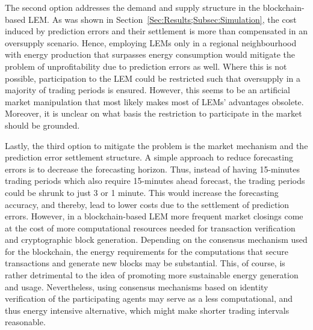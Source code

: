 The second option addresses the demand and supply structure in the blockchain-based LEM. As was shown in Section~\ref{Sec:Results;Subsec:Simulation}, the cost induced by prediction errors and their settlement is more than compensated in an oversupply scenario. Hence, employing LEMs only in a regional neighbourhood with energy production that surpasses energy consumption would mitigate the problem of unprofitability due to prediction errors as well. Where this is not possible, participation to the LEM could be restricted such that oversupply in a majority of trading periods is ensured. However, this seems to be an artificial market manipulation that most likely makes most of LEMs' advantages obsolete. Moreover, it is unclear on what basis the restriction to participate in the market should be grounded.

Lastly, the third option to mitigate the problem is the market mechanism and the prediction error settlement structure. A simple approach to reduce forecasting errors is to decrease the forecasting horizon. Thus, instead of having 15-minutes trading periods which also require 15-minutes ahead forecast, the trading periods could be shrunk to just 3 or 1 minute. This would increase the forecasting accuracy, and thereby, lead to lower costs due to the settlement of prediction errors. However, in a blockchain-based LEM more frequent market closings come at the cost of more computational resources needed for transaction verification and cryptographic block generation. Depending on the consensus mechanism used for the blockchain, the energy requirements for the computations that secure transactions and generate new blocks may be substantial. This, of course, is rather detrimental to the idea of promoting more sustainable energy generation and usage. Nevertheless, using consensus mechanisms based on identity verification of the participating agents may serve as a less computational, and thus energy intensive alternative, which might make shorter trading intervals reasonable.

